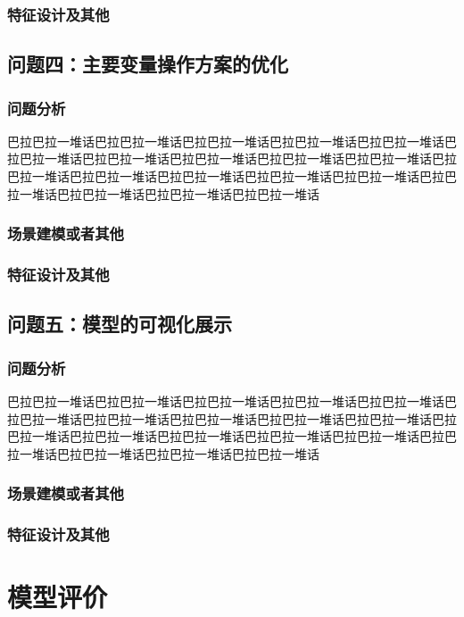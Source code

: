 \documentclass[bwprint]{gmcmthesis}
\begin{document}
\subsubsection{特征设计及其他}
\subsection{问题四：主要变量操作方案的优化}
\subsubsection{问题分析}

巴拉巴拉一堆话巴拉巴拉一堆话巴拉巴拉一堆话巴拉巴拉一堆话巴拉巴拉一堆话巴拉巴拉一堆话巴拉巴拉一堆话巴拉巴拉一堆话巴拉巴拉一堆话巴拉巴拉一堆话巴拉巴拉一堆话巴拉巴拉一堆话巴拉巴拉一堆话巴拉巴拉一堆话巴拉巴拉一堆话巴拉巴拉一堆话巴拉巴拉一堆话巴拉巴拉一堆话巴拉巴拉一堆话
\subsubsection{场景建模或者其他}

\subsubsection{特征设计及其他}
\subsection{问题五：模型的可视化展示}
\subsubsection{问题分析}

巴拉巴拉一堆话巴拉巴拉一堆话巴拉巴拉一堆话巴拉巴拉一堆话巴拉巴拉一堆话巴拉巴拉一堆话巴拉巴拉一堆话巴拉巴拉一堆话巴拉巴拉一堆话巴拉巴拉一堆话巴拉巴拉一堆话巴拉巴拉一堆话巴拉巴拉一堆话巴拉巴拉一堆话巴拉巴拉一堆话巴拉巴拉一堆话巴拉巴拉一堆话巴拉巴拉一堆话巴拉巴拉一堆话
\subsubsection{场景建模或者其他}

\subsubsection{特征设计及其他}


\section{模型评价}
\end{document}
